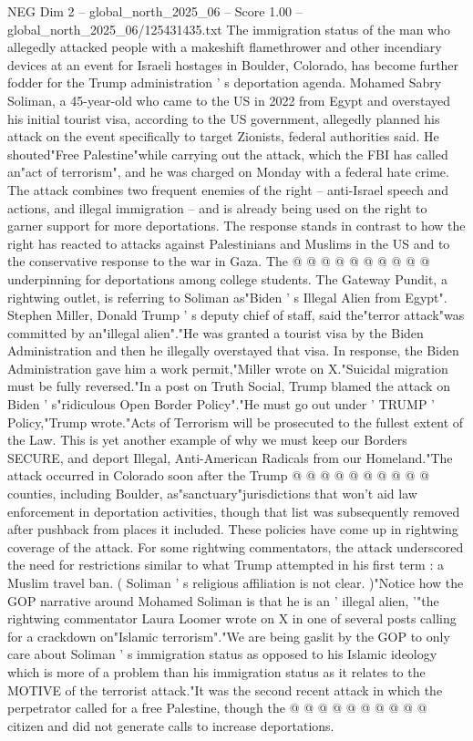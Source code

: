 \begin{textsample}{NEG Dim 2 – global\_north\_2025\_06 – Score 1.00 – global\_north\_2025\_06/125431435.txt}  \label{ex:f2_neg_225}
The immigration status of the man who allegedly attacked people with a makeshift flamethrower and other incendiary devices at an event for Israeli hostages in Boulder, Colorado, has become further fodder for the Trump administration ' s deportation agenda.
Mohamed Sabry Soliman, a 45-year-old who came to the US in 2022 from Egypt and overstayed his initial tourist visa, according to the US government, allegedly planned his attack on the event specifically to target Zionists, federal authorities said.
He shouted"Free Palestine"while carrying out the attack, which the FBI has called an"act of terrorism", and he was charged on Monday with a federal hate crime.
The attack combines two frequent enemies of the right -- anti-Israel speech and actions, and illegal immigration -- and is already being used on the right to garner support for more deportations.
The response stands in contrast to how the right has reacted to attacks against Palestinians and Muslims in the US and to the conservative response to the war in Gaza.
The @ @ @ @ @ @ @ @ @ @ underpinning for deportations among college students.
The Gateway Pundit, a rightwing outlet, is referring to Soliman as"Biden ' s Illegal Alien from Egypt".
Stephen Miller, Donald Trump ' s deputy chief of staff, said the"terror attack"was committed by an"illegal alien"."He was granted a tourist visa by the Biden Administration and then he illegally overstayed that visa.
In response, the Biden Administration gave him a work permit,"Miller wrote on X."Suicidal migration must be fully reversed."In a post on Truth Social, Trump blamed the attack on Biden ' s"ridiculous Open Border Policy"."He must go out under ' TRUMP ' Policy,"Trump wrote."Acts of Terrorism will be prosecuted to the fullest extent of the Law.
This is yet another example of why we must keep our Borders SECURE, and deport Illegal, Anti-American Radicals from our Homeland."The attack occurred in Colorado soon after the Trump @ @ @ @ @ @ @ @ @ @ counties, including Boulder, as"sanctuary"jurisdictions that won't aid law enforcement in deportation activities, though that list was subsequently removed after pushback from places it included.
These policies have come up in rightwing coverage of the attack.
For some rightwing commentators, the attack underscored the need for restrictions similar to what Trump attempted in his first term : a Muslim travel ban. ( Soliman ' s religious affiliation is not clear. )"Notice how the GOP narrative around Mohamed Soliman is that he is an ' illegal alien, '"the rightwing commentator Laura Loomer wrote on X in one of several posts calling for a crackdown on"Islamic terrorism"."We are being gaslit by the GOP to only care about Soliman ' s immigration status as opposed to his Islamic ideology which is more of a problem than his immigration status as it relates to the MOTIVE of the terrorist attack."It was the second recent attack in which the perpetrator called for a free Palestine, though the @ @ @ @ @ @ @ @ @ @ citizen and did not generate calls to increase deportations.

\end{textsample}
